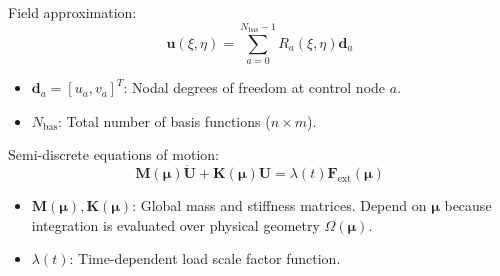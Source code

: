 \documentclass[12pt,a4paper,oneside]{report}
\newcommand{\vect}[1]{\mathbf{#1}}
\newcommand{\mat}[1]{\mathbf{#1}}
\begin{document}
Field approximation:
\begin{equation}
    \vect{u}(\xi, \eta) = \sum_{a=0}^{N_{\text{bas}}-1} R_a(\xi, \eta) \vect{d}_a
\end{equation}
\begin{tcolorbox}[colback=gray!5!white,colframe=gray!60!black,title={Term Definitions \& Parameter Dependencies}]
\begin{itemize}
    \item $\vect{d}_a = [u_a, v_a]^T$: Nodal degrees of freedom at control node $a$.
    \item $N_{\text{bas}}$: Total number of basis functions ($n \times m$).
\end{itemize}
\end{tcolorbox}

Semi-discrete equations of motion:
\begin{equation}
    \mat{M}(\boldsymbol{\mu}) \ddot{\vect{U}} + \mat{K}(\boldsymbol{\mu}) \vect{U} = \lambda(t) \vect{F}_{\text{ext}}(\boldsymbol{\mu})
\end{equation}
\begin{tcolorbox}[colback=gray!5!white,colframe=gray!60!black,title={Term Definitions \& Parameter Dependencies}]
\begin{itemize}
    \item $\mat{M}(\boldsymbol{\mu}), \mat{K}(\boldsymbol{\mu})$: Global mass and stiffness matrices. Depend on $\boldsymbol{\mu}$ because integration is evaluated over physical geometry $\Omega(\boldsymbol{\mu})$.
    \item $\lambda(t)$: Time-dependent load scale factor function.
\end{itemize}
\end{tcolorbox}
\end{document}
